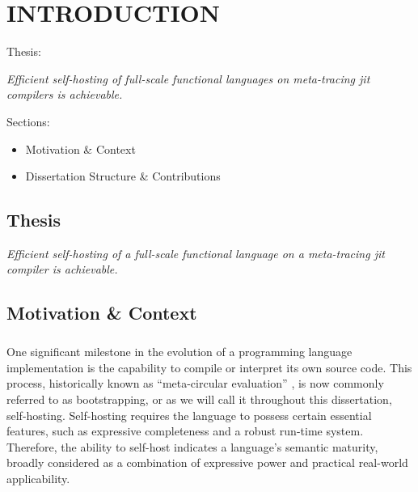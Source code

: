\chapter[\texorpdfstring{INTRODUCTION}
                          {1. Introduction}]{INTRODUCTION}
    \label{chapter:introduction}

    \begin{chaptersynopsis}

       Thesis:

        \textit{Efficient self-hosting of full-scale functional languages on meta-tracing \gls{jit} compilers is achievable.}

        \vspace{2em}

        Sections:
		\begin{itemize}
			\item Motivation \& Context
			\item Dissertation Structure \& Contributions
		\end{itemize}
    \end{chaptersynopsis}

    \section{Thesis}

    \textit{Efficient self-hosting of a full-scale functional language on a meta-tracing \gls{jit} compiler is achievable.}


    \section[\texorpdfstring{Motivation \& Context}{Context}]{Motivation \& Context}

        \paragraph{}%
            One significant milestone in the evolution of a programming language implementation is the capability to compile or interpret its own source code. This process, historically known as “meta-circular evaluation” \cite{sicpbook}, is now commonly referred to as bootstrapping, or as we will call it throughout this dissertation, self-hosting. Self-hosting requires the language to possess certain essential features, such as expressive completeness and a robust run-time system. Therefore, the ability to self-host indicates a language's semantic maturity, broadly considered as a combination of expressive power and practical real-world applicability.

